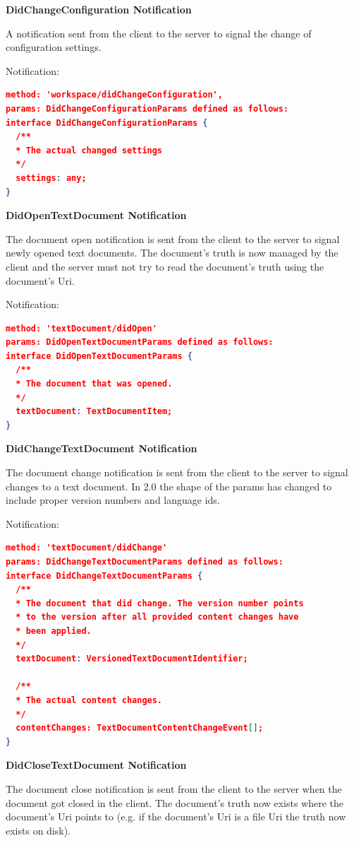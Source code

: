 \textbf{DidChangeConfiguration Notification}

A notification sent from the client to the server to signal the change of configuration settings.

Notification:
\begin{lstlisting}[language=json,firstnumber=1]
method: 'workspace/didChangeConfiguration',
params: DidChangeConfigurationParams defined as follows:
interface DidChangeConfigurationParams {
  /**
  * The actual changed settings
  */
  settings: any;
}
\end{lstlisting}

\textbf{DidOpenTextDocument Notification}

The document open notification is sent from the client to the server to signal newly opened text documents. The document's truth is now managed by the client and the server must not try to read the document's truth using the document's Uri.

Notification:
\begin{lstlisting}[language=json,firstnumber=1]
method: 'textDocument/didOpen'
params: DidOpenTextDocumentParams defined as follows:
interface DidOpenTextDocumentParams {
  /**
  * The document that was opened.
  */
  textDocument: TextDocumentItem;
}
\end{lstlisting}

\textbf{DidChangeTextDocument Notification}

The document change notification is sent from the client to the server to signal changes to a text document. In 2.0 the shape of the params has changed to include proper version numbers and language ids.

Notification:
\begin{lstlisting}[language=json,firstnumber=1]
method: 'textDocument/didChange'
params: DidChangeTextDocumentParams defined as follows:
interface DidChangeTextDocumentParams {
  /**
  * The document that did change. The version number points
  * to the version after all provided content changes have
  * been applied.
  */
  textDocument: VersionedTextDocumentIdentifier;
	
  /**
  * The actual content changes.
  */
  contentChanges: TextDocumentContentChangeEvent[];
}
\end{lstlisting}

\textbf{DidCloseTextDocument Notification}

The document close notification is sent from the client to the server when the document got closed in the client. The document's truth now exists where the document's Uri points to (e.g. if the document's Uri is a file Uri the truth now exists on disk).

